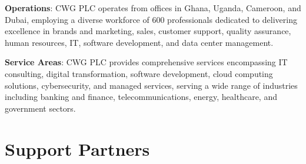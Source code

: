 \documentclass[a4paper,12pt]{report}
\begin{document}
	\textbf{Operations}: CWG PLC operates from offices in Ghana, Uganda, Cameroon, and Dubai, employing a diverse workforce of 600 professionals dedicated to delivering excellence in brands and marketing, sales, customer support, quality assurance, human resources, IT, software development, and data center management.
	
	\textbf{Service Areas}: CWG PLC provides comprehensive services encompassing IT consulting, digital transformation, software development, cloud computing solutions, cybersecurity, and managed services, serving a wide range of industries including banking and finance, telecommunications, energy, healthcare, and government sectors.
	
	\section{Support Partners}
	
\end{document}
